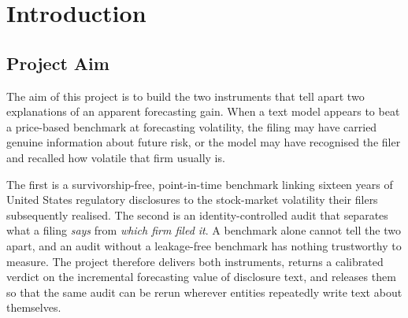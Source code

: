 \chapter{Introduction}
\label{ch:intro}

\section{Project Aim}
\label{sec:intro-aim}

The aim of this project is to build the two instruments that tell apart two explanations of an apparent forecasting gain.
When a text model appears to beat a price-based benchmark at forecasting volatility, the filing may have carried genuine
information about future risk, or the model may have recognised the filer and recalled how volatile that firm usually is.

The first is a survivorship-free, point-in-time benchmark linking sixteen years of United States regulatory disclosures to the stock-market volatility their filers subsequently realised. The second is an identity-controlled audit that separates what a filing \emph{says} from \emph{which firm filed it}. A benchmark alone cannot tell the two apart, and an audit without a leakage-free benchmark has nothing trustworthy to measure. The project therefore delivers both instruments, returns a calibrated verdict on the incremental forecasting value of disclosure text, and releases them so that the same audit can be rerun wherever entities repeatedly write text about themselves.

